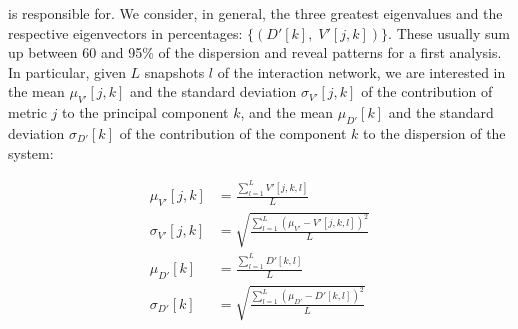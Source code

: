 \documentclass[%
	aip,
	jmp,%
	amsmath,amssymb,
	reprint,%
]{revtex4-1}
\begin{document}
																																																																																is responsible for.
																																																																																We consider, in general, the three greatest eigenvalues and
																																																																																the respective eigenvectors in percentages:
																																																																																$\{(D'[k],\;V'[j,k])\}$.
																																																																																These usually sum up between 60 and 95\% of the dispersion
																																																																																and reveal patterns for a first analysis.
																																																																																In particular, 
																																																																																given $L$ snapshots $l$ of the interaction network,
																																																																																we are interested in the mean
																																																																																$\mu_{V'}[j,k]$
																																																																																and the standard deviation $\sigma_{V'}[j,k]$ 
																																																																																of the contribution of metric $j$ to the principal component $k$,
																																																																																and the mean
																																																																																$\mu_{D'}[k]$
																																																																																and the standard deviation 
																																																																																$\sigma_{D'}[k]$
																																																																																of the contribution of the component $k$ to the dispersion
																																																																																of the system:

																																																																																\begin{align}\label{eq:pca}
																																																																																	\mu_{V'}[j,k]   &=\frac{\sum_{l=1}^L V'[j,k,l]}{L}\nonumber\\
																																																																																	\sigma_{V'}[j,k]&=\sqrt{\frac{\sum_{l=1}^L (\mu_{V'}-V'[j,k,l])^2}{L}}\\\nonumber
																																																																																	\mu_{D'}[k]&=\frac{\sum_{l=1}^L D'[k,l]}{L}\\\nonumber
																																																																																	\sigma_{D'}[k]&=\sqrt{\frac{\sum_{l=1}^L (\mu_{D'}-D'[k,l])^2}{L}}
																																																																																\end{align}
\end{document}
